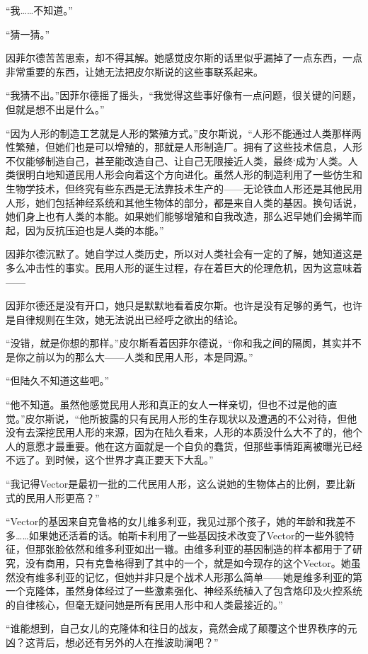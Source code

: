 “我……不知道。”

“猜一猜。”

因菲尔德苦苦思索，却不得其解。她感觉皮尔斯的话里似乎漏掉了一点东西，一点非常重要的东西，让她无法把皮尔斯说的这些事联系起来。

“我猜不出。”因菲尔德摇了摇头，“我觉得这些事好像有一点问题，很关键的问题，但就是想不出是什么。”

“因为人形的制造工艺就是人形的繁殖方式。”皮尔斯说，“人形不能通过人类那样两性繁殖，但她们也是可以增殖的，那就是人形制造厂。拥有了这些技术信息，人形不仅能够制造自己，甚至能改造自己、让自己无限接近人类，最终‘成为’人类。人类很明白地知道民用人形会向着这个方向进化。虽然人形的制造利用了一些仿生和生物学技术，但终究有些东西是无法靠技术生产的——无论铁血人形还是其他民用人形，她们包括神经系统和其他生物体的部分，都是来自人类的基因。换句话说，她们身上也有人类的本能。如果她们能够增殖和自我改造，那么迟早她们会揭竿而起，因为反抗压迫也是人类的本能。”

因菲尔德沉默了。她自学过人类历史，所以对人类社会有一定的了解，她知道这是多么冲击性的事实。民用人形的诞生过程，存在着巨大的伦理危机，因为这意味着——

因菲尔德还是没有开口，她只是默默地看着皮尔斯。也许是没有足够的勇气，也许是自律规则在生效，她无法说出已经呼之欲出的结论。

“没错，就是你想的那样。”皮尔斯看着因菲尔德说，“你和我之间的隔阂，其实并不是你之前以为的那么大——人类和民用人形，本是同源。”

“但陆久不知道这些吧。”

“他不知道。虽然他感觉民用人形和真正的女人一样亲切，但也不过是他的直觉。”皮尔斯说，“他所披露的只有民用人形的生存现状以及遭遇的不公对待，但他没有去深挖民用人形的来源，因为在陆久看来，人形的本质没什么大不了的，他个人的意愿才最重要。他在这方面就是一个自负的蠢货，但那些事情距离被曝光已经不远了。到时候，这个世界才真正要天下大乱。”

“我记得Vector是最初一批的二代民用人形，这么说她的生物体占的比例，要比新式的民用人形更高？”

“Vector的基因来自克鲁格的女儿维多利亚，我见过那个孩子，她的年龄和我差不多……如果她还活着的话。帕斯卡利用了一些基因技术改变了Vector的一些外貌特征，但那张脸依然和维多利亚如出一辙。由维多利亚的基因制造的样本都用于了研究，没有商用，只有克鲁格得到了其中的一个，就是如今现存的这个Vector。她虽然没有维多利亚的记忆，但她并非只是个战术人形那么简单——她是维多利亚的第一个克隆体，虽然身体经过了一些激素强化、神经系统植入了包含烙印及火控系统的自律核心，但毫无疑问她是所有民用人形中和人类最接近的。”

“谁能想到，自己女儿的克隆体和往日的战友，竟然会成了颠覆这个世界秩序的元凶？这背后，想必还有另外的人在推波助澜吧？”

